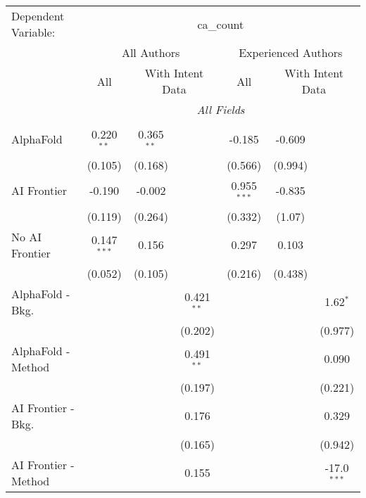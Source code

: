 \begingroup
\centering
\begin{tabular}{lcccccc}
   \tabularnewline \midrule \midrule
   Dependent Variable: & \multicolumn{6}{c}{ca\_count}\\
 & \multicolumn{3}{c}{All Authors} & \multicolumn{3}{c}{Experienced Authors} \\
\cmidrule(lr){2-4} \cmidrule(lr){5-7}
 & \multicolumn{1}{c}{All} & \multicolumn{2}{c}{With Intent Data} & \multicolumn{1}{c}{All} & \multicolumn{2}{c}{With Intent Data} \\
\cmidrule(lr){2-2} \cmidrule(lr){3-4} \cmidrule(lr){5-5} \cmidrule(lr){6-7}
 & \multicolumn{6}{c}{\textit{All Fields}} \\ \\
   AlphaFold               & 0.220$^{**}$  & 0.365$^{**}$ &              & -0.185        & -0.609  &   \\   
                           & (0.105)       & (0.168)      &              & (0.566)       & (0.994) &   \\   
   AI Frontier             & -0.190        & -0.002       &              & 0.955$^{***}$ & -0.835  &   \\   
                           & (0.119)       & (0.264)      &              & (0.332)       & (1.07)  &   \\   
   No AI Frontier          & 0.147$^{***}$ & 0.156        &              & 0.297         & 0.103   &   \\   
                           & (0.052)       & (0.105)      &              & (0.216)       & (0.438) &   \\   
   AlphaFold - Bkg.        &               &              & 0.421$^{**}$ &               &         & 1.62$^{*}$\\   
                           &               &              & (0.202)      &               &         & (0.977)\\   
   AlphaFold - Method      &               &              & 0.491$^{**}$ &               &         & 0.090\\   
                           &               &              & (0.197)      &               &         & (0.221)\\   
   AI Frontier - Bkg.      &               &              & 0.176        &               &         & 0.329\\   
                           &               &              & (0.165)      &               &         & (0.942)\\   
   AI Frontier - Method    &               &              & 0.155        &               &         & -17.0$^{***}$\\   

\end{tabular}
